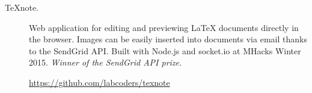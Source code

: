 \documentclass{article}
\begin{document}
\begin{description}


  \item[TeXnote.]
    Web application for editing and previewing \LaTeX{} documents directly in
    the browser. Images can be easily inserted into documents via email thanks
    to the SendGrid API. Built with Node.js and socket.io at MHacks Winter
    2015. \emph{Winner of the SendGrid API prize.}

    \url{https://github.com/labcoders/texnote}
\end{description}
\end{document}
